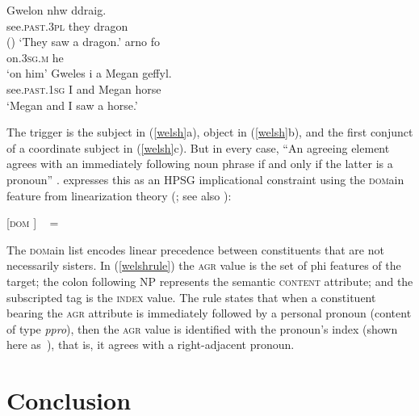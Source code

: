 \documentclass[output=paper
 	        ,biblatex
                ,babelshorthands
                ,newtxmath
                ,draftmode
                ,colorlinks, citecolor=brown
]{langscibook}
\begin{document}
\begin{exe}
\ex \label{welsh}
\begin{xlist}
\ex
\gll 	Gwelon nhw ddraig. \\
see.\textsc{past.3pl} they dragon \\\hfill()
\glt `They saw a dragon.’
\ex 
\gll 	arno fo \\
on.\textsc{3sg.m} he \\
\glt `on him’
\ex 
\gll 	Gweles i a Megan geffyl. \\
see.\textsc{past.1sg} I and Megan horse \\
\glt `Megan and I saw a horse.’
\end{xlist}
\end{exe}

\noindent
The trigger is the subject in (\ref{welsh}a), object in (\ref{welsh}b), and the first conjunct of a coordinate subject in (\ref{welsh}c).  But in every case, ``An agreeing element agrees with an immediately following noun phrase if and only if the latter is a pronoun'' \citep[237]{Borsley:2009}. \citet[257]{Borsley:2009} expresses this as an HPSG implicational constraint using the \textsc{dom}ain feature from linearization theory (\citealt{reape:1994,Mueller95c,Mueller99a,Kathol:2000}; see also ):

\begin{exe}
\ex \label{welshrule}
{}[\textsc{dom}   ]  %
\impl  \  = 
\end{exe}

\noindent
The \textsc{dom}ain list encodes linear precedence between constituents that are not necessarily sisters.  In (\ref{welshrule}) the \textsc{agr} value is the set of phi features of the target; the colon following NP represents the semantic \textsc{content} attribute; and the subscripted tag  is the \textsc{index} value.  The rule states that when a constituent bearing the \textsc{agr} attribute is immediately followed by a personal pronoun (content of type \textit{ppro}), then the \textsc{agr} value is identified with the pronoun's index (shown here as \,), that is, it agrees with a right-adjacent pronoun.  



\section{Conclusion} 
\end{document}
